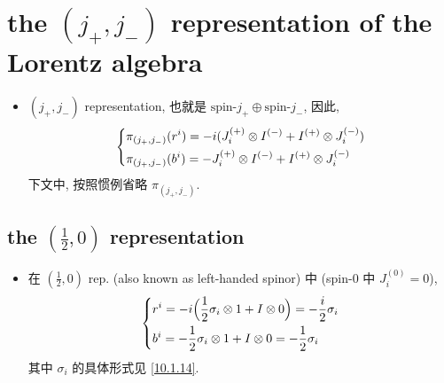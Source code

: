 \section{the \texorpdfstring{$(j_+, j_-)$}{(j+, j-)} representation of the Lorentz algebra}
\begin{itemize}
	\item $(j_+, j_-)$ representation, 也就是 $\text{spin-} j_+ \oplus \text{spin-} j_-$, 因此,
	\begin{equation}
		\begin{dcases}
			\pi_{(j_+, j_-)}(r^i) = - i (J^{(+)}_i \otimes I^{(-)} + I^{(+)} \otimes J^{(-)}_i) \\
			\pi_{(j_+, j_-)}(b^i) = - J^{(+)}_i \otimes I^{(-)} + I^{(+)} \otimes J^{(-)}_i
		\end{dcases}
	\end{equation}
	下文中, 按照惯例省略 $\pi_{(j_+, j_-)}$.
\end{itemize}

\subsection{the \texorpdfstring{$(\frac{1}{2}, 0)$}{(1/2, 0)} representation}
\begin{itemize}
	\item 在 $(\frac{1}{2}, 0)$ rep. (also known as left-handed spinor) 中 (spin-$0$ 中 $J^{(0)}_i = 0$),
	\begin{equation}
		\begin{dcases}
			r^i = - i \Big( \frac{1}{2} \sigma_i \otimes 1 + I \otimes 0 \Big) = - \frac{i}{2} \sigma_i \\
			b^i = - \frac{1}{2} \sigma_i \otimes 1 + I \otimes 0 = - \frac{1}{2} \sigma_i
		\end{dcases}
	\end{equation}
	其中 $\sigma_i$ 的具体形式见 \eqref{10.1.14}.
\end{itemize}

